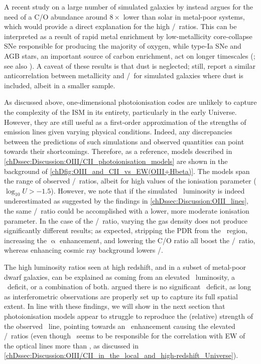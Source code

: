 A recent study on a large number of simulated galaxies by \citet{2022MNRAS.510.5603K} instead argues for the need of a C/O abundance around $8 \times$ lower than solar in metal-poor systems, which would provide a direct explanation for the high \OIIIf/\CII\ ratios. This can be interpreted as a result of rapid metal enrichment by low-metallicity core-collapse SNe responsible for producing the majority of oxygen, while type-Ia SNe and AGB stars, an important source of carbon enrichment, act on longer timescales (\citealt{2020MNRAS.498.5541A}; see also ). A caveat of these results is that dust is neglected; still, \citet{2020MNRAS.498.5541A} report a similar anticorrelation between metallicity and \OIIIf/\CII\ for simulated galaxies where dust is included, albeit in a smaller sample.

As discussed above, one-dimensional photoionisation codes are unlikely to capture the complexity of the ISM in its entirety, particularly in the early Universe. However, they are still useful as a first-order approximation of the strengths of emission lines given varying physical conditions. Indeed, any discrepancies between the predictions of such simulations and observed quantities can point towards their shortcomings. Therefore, as a reference,  models described in \cref{chDssec:Discussion:OIII/CII_photoionisation_models} are shown in the background of \cref{chDfig:OIII_and_CII_vs_EW(OIII+Hbeta)}. The models span the range of observed \OIIIf/\CII\ ratios, albeit for high values of the ionisation parameter ($\log_{10} U > -1.5$). However, we note that if the simulated \OIIIf\ luminosity is indeed underestimated as suggested by the findings in \cref{chDssec:Discussion:OIII_lines}, the same \OIIIf/\CII\ ratio could be accomplished with a lower, more moderate ionisation parameter. In the case of the \OIIIf/\CII\ ratio, varying the gas density does not produce significantly different results; as expected, stripping the PDR from the \HII\ region, increasing the $\upalpha$ enhancement, and lowering the C/O ratio all boost the \OIIIf/\CII\ ratio, whereas enhancing cosmic ray background lowers \OIIIf/\CII.

The high luminosity ratios seen at high redshift, and in a subset of metal-poor dwarf galaxies, can be explained as coming from an elevated \OIIILam\ luminosity, a \CIILam\ deficit, or a combination of both. \citet{2020MNRAS.499.5136C} argued there is no significant \CII\ deficit, as long as interferometric observations are properly set up to capture its full spatial extent. In line with these findings, we will show in the next section that photoionisation models appear to struggle to reproduce the (relative) strength of the observed \OIIILam\ line, pointing towards an \OIIIf\ enhancement causing the elevated \OIIIf/\CII\ ratios (even though \CII\ seems to be responsible for the correlation with EW of the optical lines more than \OIIIf, as discussed in \cref{chDssec:Discussion:OIII/CII_in_the_local_and_high-redshift_Universe}).

